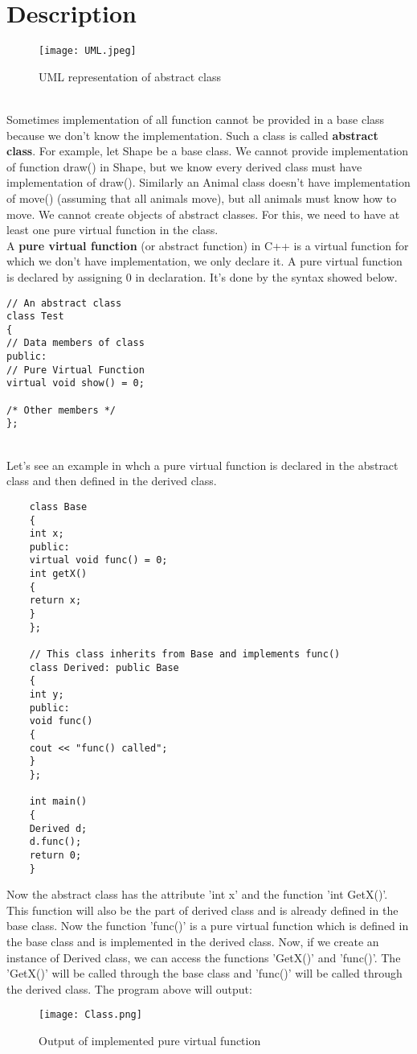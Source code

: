 \documentclass[11pt,fleqn]{book} %
\begin{document}
\section{Description}
\begin{figure}[h]
	\centering
	\texttt{[image: UML.jpeg]}
	\caption{UML representation of abstract class}
\end{figure} ~\\
Sometimes implementation of all function cannot be provided in a base class because we don’t know the implementation. Such a class is called \textbf{abstract class}. For example, let Shape be a base class. We cannot provide implementation of function draw() in Shape, but we know every derived class must have implementation of draw(). Similarly an Animal class doesn’t have implementation of move() (assuming that all animals move), but all animals must know how to move. We cannot create objects of abstract classes. For this, we need to have at least one pure virtual function in the class. \\
A \textbf{pure virtual function} (or abstract function) in C++ is a virtual function for which we don’t have implementation, we only declare it. A pure virtual function is declared by assigning 0 in declaration. It's done by the syntax showed below.
\begin{lstlisting}
// An abstract class
class Test
{   
// Data members of class
public:
// Pure Virtual Function
virtual void show() = 0;

/* Other members */
};
\end{lstlisting} ~\\
Let's see an example in whch a pure virtual function is declared in the abstract class and then defined in the derived class.
\begin{example}
	\begin{lstlisting}
	class Base
	{
	int x;
	public:
	virtual void func() = 0;
	int getX() 
	{
	return x; 
	}
	};
	
	// This class inherits from Base and implements func()
	class Derived: public Base
	{
	int y;
	public:
	void func()
	{
	cout << "func() called";
	}
	};
	
	int main()
	{
	Derived d;
	d.func();
	return 0;
	}
	\end{lstlisting}
	Now the abstract class has the attribute 'int x' and the function 'int GetX()'. This function will also be the part of derived class and is already defined in the base class. Now the function 'func()' is a pure virtual function which is defined in the base class and is implemented in the derived class. Now, if we create an instance of Derived class, we can access the functions 'GetX()' and 'func()'. The 'GetX()' will be called through the base class and 'func()' will be called through the derived class.
	The program above will output:
	\begin{figure}[h]
		\centering
		\texttt{[image: Class.png]}
		\caption{Output of implemented pure virtual function}
	\end{figure}
\end{example}
\end{document}

